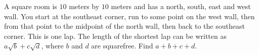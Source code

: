 A square room is $10$ meters by $10$ meters and has a north, south, east and west wall. You start at the southeast corner, run to some point on the west wall, then from that point to the midpoint of the north wall, then back to the southeast corner. This is one lap. The length of the shortest lap can be written as $a\sqrt b+c\sqrt d$, where $b$ and $d$ are squarefree. Find $a+b+c+d$.
